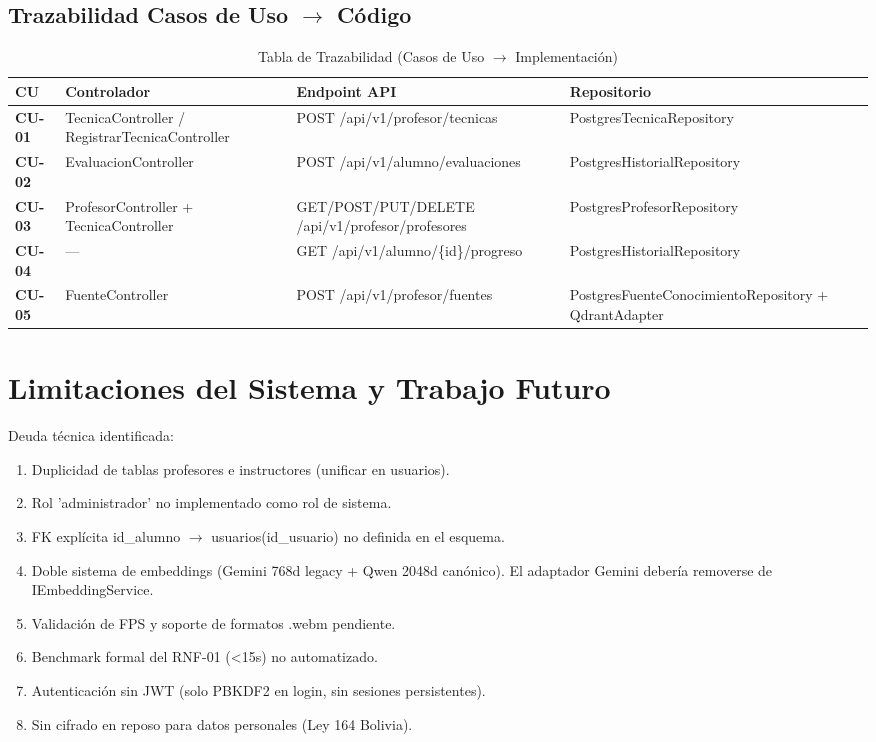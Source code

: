 \subsection{Trazabilidad Casos de Uso $\rightarrow$ Código}
\begin{table}[htbp]
\centering
\small
\begin{tabularx}{\textwidth}{|>{\bfseries}l|X|X|X|}
    \hline
    CU & Controlador & Endpoint API & Repositorio \\ \hline
    CU-01 & TecnicaController / RegistrarTecnicaController & POST /api/v1/profesor/tecnicas & PostgresTecnicaRepository \\ \hline
    CU-02 & EvaluacionController & POST /api/v1/alumno/evaluaciones & PostgresHistorialRepository \\ \hline
    CU-03 & ProfesorController + TecnicaController & GET/POST/PUT/DELETE /api/v1/profesor/profesores & PostgresProfesorRepository \\ \hline
    CU-04 & — & GET /api/v1/alumno/\{id\}/progreso & PostgresHistorialRepository \\ \hline
    CU-05 & FuenteController & POST /api/v1/profesor/fuentes & PostgresFuenteConocimientoRepository + QdrantAdapter \\ \hline
\end{tabularx}
\caption{Tabla de Trazabilidad (Casos de Uso $\rightarrow$ Implementación)}
\label{tab:trazabilidad}
\end{table}

\section{Limitaciones del Sistema y Trabajo Futuro}

Deuda técnica identificada:
\begin{enumerate}
    \item Duplicidad de tablas profesores e instructores (unificar en usuarios).
    \item Rol 'administrador' no implementado como rol de sistema.
    \item FK explícita id\_alumno $\rightarrow$ usuarios(id\_usuario) no definida en el esquema.
    \item Doble sistema de embeddings (Gemini 768d legacy + Qwen 2048d canónico). El adaptador Gemini debería removerse de IEmbeddingService.
    \item Validación de FPS y soporte de formatos .webm pendiente.
    \item Benchmark formal del RNF-01 (<15s) no automatizado.
    \item Autenticación sin JWT (solo PBKDF2 en login, sin sesiones persistentes).
    \item Sin cifrado en reposo para datos personales (Ley 164 Bolivia).
\end{enumerate}
